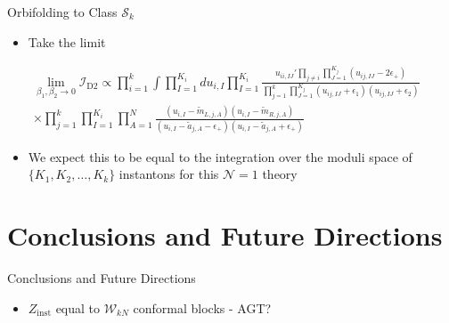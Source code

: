 \documentclass{beamer}
\begin{document}
\begin{frame}{Orbifolding to Class $\mathcal{S}_k$}
        \begin{center}
        \end{center}
\begin{itemize}
\item{Take the limit}
    \end{itemize}
\begin{equation*}
\begin{aligned}
    \lim_{\beta_1,\beta_2\to0} \mathcal{I}_{\text{D2}}\propto\prod_{i=1}^k\int \prod_{I=1}^{K_i}du_{i,I}\prod_{I=1}^{K_i}\frac{u_{ii,IJ}'\prod_{j\neq i}\prod_{J=1}^{K_j}\left(u_{ij,IJ}-2\epsilon_+\right)}{\prod_{j=1}^k\prod_{J=1}^{K_j}\left(u_{ij,IJ}+\epsilon_1\right)\left(u_{ij,IJ}+\epsilon_2\right)}&\\
    \times\prod_{j=1}^k\prod_{I=1}^{K_i}\prod_{A=1}^N\frac{\left(u_{i,I}-\widetilde{m}_{L,j,A}\right)\left(u_{i,I}-\widetilde{m}_{R,j,A}\right)}{\left(u_{i,I}-\widetilde{a}_{j,A}-\epsilon_+\right)\left(u_{i,I}-\widetilde{a}_{j,A}+\epsilon_+\right)}&
    \end{aligned}
\end{equation*}
\begin{itemize}
\item{We expect this to be equal to the integration over the moduli space of $\{K_1,K_2,\dots,K_k\}$ instantons for this $\mathcal{N}=1$ theory}
    \end{itemize}
\end{frame}


\section{Conclusions and Future Directions}

\begin{frame}{Conclusions and Future Directions}
  \begin{itemize}
\item{$Z_{\text{inst}}$ equal to $\mathcal{W}_{kN}$ conformal blocks - AGT?}
  \end{itemize}
\end{frame}
\end{document}
